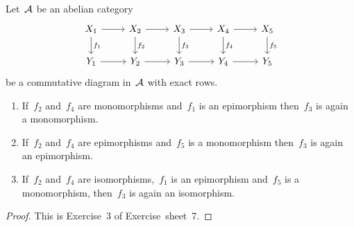 \begin{lemma*}[5-Lemma]
  \label{5 lemma}
  Let~$\mathcal{A}$ be an abelian category
  \[
    \begin{tikzcd}
        X_1
        \arrow{r}
        \arrow{d}[right]{f_1}
      & X_2
        \arrow{r}
        \arrow{d}[right]{f_2}
      & X_3
        \arrow{r}
        \arrow{d}[right]{f_3}
      & X_4
        \arrow{r}
        \arrow{d}[right]{f_4}
      & X_5
        \arrow{d}[right]{f_5}
      \\
        Y_1
        \arrow{r}
      & Y_2
        \arrow{r}
      & Y_3
        \arrow{r}
      & Y_4
        \arrow{r}
      & Y_5
    \end{tikzcd}
  \]
  be a commutative diagram in~$\mathcal{A}$ with exact rows.
  \begin{enumerate}
    \item
      If~$f_2$ and~$f_4$ are monomorphisms and~$f_1$ is an epimorphism then~$f_3$ is again a monomorphism.
    \item
      If~$f_2$ and~$f_4$ are epimorphisms and~$f_5$ is a monomorphism then~$f_3$ is again an epimorphism.
    \item
      If~$f_2$ and~$f_4$ are isomorphisms,~$f_1$ is an epimorphism and~$f_5$ is a monomorphism, then~$f_3$ is again an isomorphism.
  \end{enumerate}
\end{lemma*}


\begin{proof}
  This is Exercise~3 of Exercise~sheet~7.
\end{proof}



